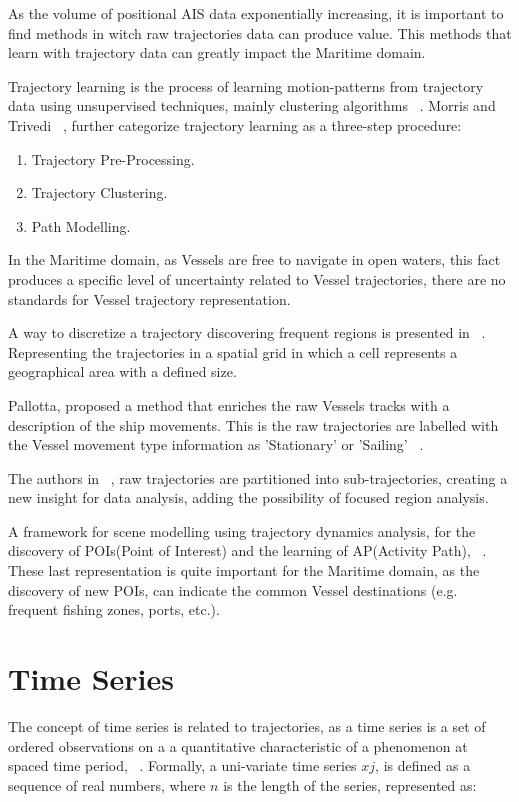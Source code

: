 As the volume of positional AIS data exponentially increasing, it is important to find methods in witch raw trajectories data can produce value. This methods that learn with trajectory data can greatly impact the Maritime domain.

Trajectory learning is the process of learning motion-patterns from trajectory data using unsupervised techniques, mainly clustering algorithms ~\cite{LeGuillarme2013}.
Morris and Trivedi ~\cite{Morris2008}, further categorize trajectory learning as a three-step procedure: 

\begin{enumerate}
\item Trajectory Pre-Processing.
\item Trajectory Clustering. 
\item Path Modelling.
\end{enumerate}

In the Maritime domain, as Vessels are free to navigate in open waters, this fact produces a specific level of uncertainty related to Vessel trajectories, there are no standards for Vessel trajectory representation.

A way to discretize a trajectory discovering frequent regions is presented in ~\cite{Lei2016}. Representing the trajectories in a spatial grid in which a cell represents a geographical area with a defined size.

Pallotta, proposed a method that enriches the raw Vessels tracks with a description of the ship movements. This is the raw trajectories are labelled with the Vessel movement type information as 'Stationary' or 'Sailing' ~\cite{Pallotta2013}.

The authors in ~\cite{Lee}, raw trajectories are partitioned into sub-trajectories, creating a new insight for data analysis, adding the possibility of focused region analysis.  

A framework for scene modelling using trajectory dynamics analysis, for the discovery of POIs(Point of Interest) and the learning of AP(Activity Path), ~\cite{Morris2008}. 
These last representation is quite important for the Maritime domain, as the discovery of new POIs, can indicate the common Vessel destinations (e.g. frequent fishing zones, ports, etc.).  

\section{Time Series}
\label{section: Time Series}
The concept of time series is related to trajectories, as a time series is a set of ordered observations on a a quantitative characteristic of a
phenomenon at spaced time period, ~\cite{Ivanovic2016b}. Formally, a uni-variate time series $xj$, is defined as a sequence of real numbers, where $n$ is the length of the series, represented as:

